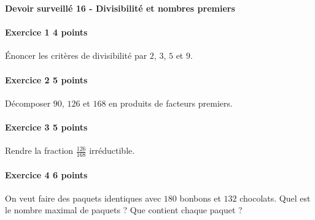 \documentclass[a4paper,10pt]{article}
\newenvironment{exercice}[2]{\paragraph{Exercice #1 \hfill #2 points}\mbox{}\par}{\medskip}
\begin{document}
\begin{center}\Large\bfseries Devoir surveillé 16 - Divisibilité et nombres premiers\end{center}
\vspace{2mm}
\begin{exercice}{1}{4}Énoncer les critères de divisibilité par $2$, $3$, $5$ et $9$.\end{exercice}\begin{exercice}{2}{5}Décomposer $90$, $126$ et $168$ en produits de facteurs premiers.\end{exercice}\begin{exercice}{3}{5}Rendre la fraction $\frac{126}{168}$ irréductible.\end{exercice}\begin{exercice}{4}{6}On veut faire des paquets identiques avec $180$ bonbons et $132$ chocolats. Quel est le nombre maximal de paquets ? Que contient chaque paquet ?\end{exercice}
\end{document}
